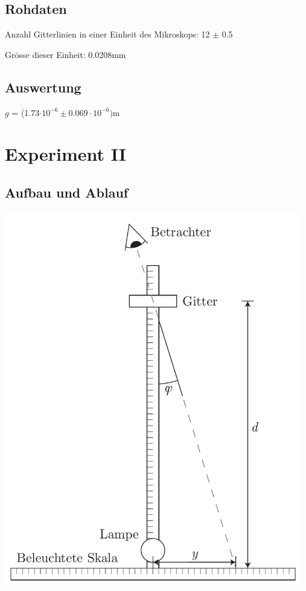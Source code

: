 \documentclass[12pt,a4paper]{article}
\begin{document}
\subsection*{Rohdaten}
Anzahl Gitterlinien in einer Einheit des Mikroskops: 12 $\pm$ 0.5

Gr\"osse dieser Einheit: 0.0208mm

\subsection*{Auswertung}
$g$ = (1.73$\cdot 10^{-6} \pm 0.069\cdot 10^{-6})$m

\section*{Experiment II}

\subsection*{Aufbau und Ablauf}
\begin{center}
\includegraphics[width=13cm]{illustration.pdf}
\end{center}
\end{document}
